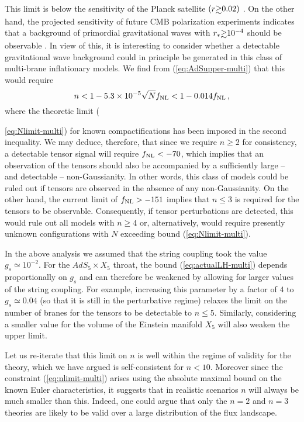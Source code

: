 This limit is below the sensitivity of the Planck satellite 
$(r \gsim 0.02 )$ \cite{planck}. On the other hand, 
the projected sensitivity of future CMB polarization experiments 
indicates that a background of primordial 
gravitational waves with $r_* \gsim 10^{-4}$ 
should be observable \cite{songknox,vpj}. In view of this, 
it is interesting to consider whether
a detectable gravitational wave background could in principle 
be generated in this class of multi-brane inflationary 
models. We find from (\ref{eq:AdSupper-multi}) that this would require 
% 
\begin{equation}
\label{eq:nlimit-multi}
n < 1 -5.3 \times 10^{-5} \sqrt{N} f_{\mathrm{NL}} < 1-0.014 f_{\mathrm{NL}} \,,
\end{equation}
% 
where the theoretic limit ({\ref{eq:Nlimit-multi}) for 
known compactifications has been imposed in the 
second inequality. We may deduce, therefore, that  
since we require $n \ge 2$ for consistency, a detectable tensor 
signal will require $f_{\mathrm{NL}} < -70$, which implies that an observation of 
the tensors should also be 
accompanied by a sufficiently large -- and detectable -- non-Gaussianity. 
In other words, this class of models could  
be ruled out if tensors are observed in the absence of any
non-Gaussianity. On the other hand, the current 
limit of  $f_{\mathrm{NL}} >-151$ implies that $n \le 3$ is required 
for the tensors to be observable. 
Consequently, if tensor perturbations are detected, this would rule 
out all models with $n \ge  4$ or, alternatively, would require presently 
unknown configurations with $N$ exceeding bound (\ref{eq:Nlimit-multi}). 


In the above analysis we assumed that the string coupling 
took the value $g_s \simeq 10^{-2}$. For the $AdS_5 \times X_5$ throat, 
the bound (\ref{eq:actualLH-multi}) depends proportionally on $g_s$ and can 
therefore be weakened by allowing for larger values of the string coupling. 
For example, increasing this parameter by a factor of $4$ 
to $g_s \simeq 0.04$ (so that it is still in the perturbative regime)
relaxes the limit on the number of branes for the tensors to be detectable to 
$n \le 5$. Similarly, considering a smaller value for the 
volume of the Einstein manifold $X_5$ will also weaken the upper limit. 


Let us re-iterate that this limit on $n$ is well within the 
regime of validity for the theory, which we have argued is 
self-consistent for $n<10$. Moreover since the constraint (\ref{eq:nlimit-multi})
arises using the absolute maximal bound on the known 
Euler characteristics, it suggests that in realistic scenarios $n$ will 
always be much smaller than this. Indeed, one could argue that 
only the $n=2$ and $n=3$ theories are
likely to be valid over a large distribution of the flux landscape. 


}
